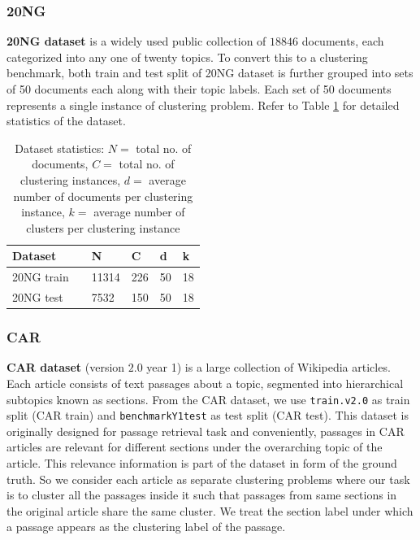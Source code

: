 \documentclass[11pt,a4paper]{article}
\begin{document}
\subsubsection{20NG} \textbf{20NG dataset} is a widely used public collection of $18846$ documents, each categorized into any one of twenty topics. To convert this to a clustering benchmark, both train and test split of 20NG dataset is further grouped into sets of 50 documents each along with their topic labels. Each set of 50 documents represents a single instance of clustering problem. Refer to Table \ref{tab:dat20ng} for detailed statistics of the dataset.
\begin{table}[h]
\caption{Dataset statistics: $N=$ total no. of documents, $C=$ total no. of clustering instances, $d=$ average number of documents per clustering instance, $k=$ average number of clusters per clustering instance}
\begin{tabular}{llllll}
\hline
Dataset && N & C & d & k \\ \hline
20NG train && 11314 & 226 & 50 & 18 \\
20NG test  && 7532 & 150 & 50 & 18 \\ 
\end{tabular}
\label{tab:dat20ng}
\end{table}

\subsubsection{CAR} \textbf{CAR dataset} (version $2.0$ year 1) is a large collection of Wikipedia articles. Each article consists of text passages about a topic, segmented into hierarchical subtopics known as sections. From the CAR dataset, we use \texttt{train.v2.0} as train split (CAR train) and \texttt{benchmarkY1test} as test split (CAR test).  This dataset is originally designed for passage retrieval task and conveniently, passages in CAR articles are relevant for different sections under the overarching topic of the article. This relevance information is part of the dataset in form of the ground truth. So we consider each article as separate clustering problems where our task is to cluster all the passages inside it such that passages from same sections in the original article share the same cluster. We treat the section label under which a passage appears as the clustering label of the passage.
\end{document}
